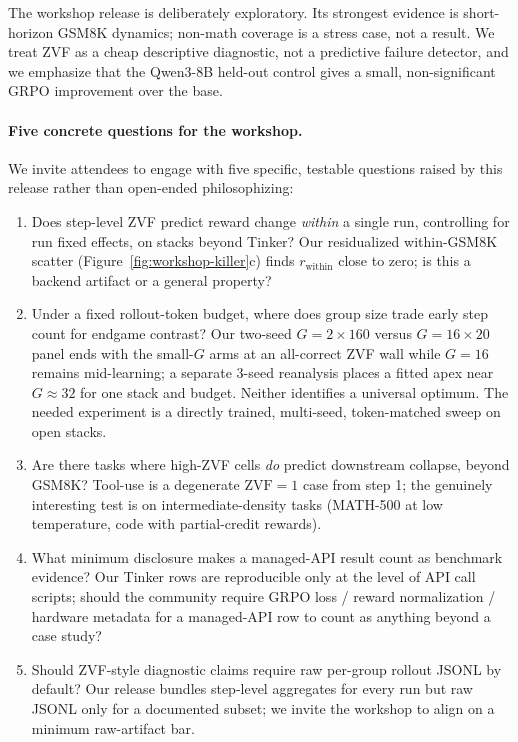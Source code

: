 \documentclass{article}
\begin{document}
The workshop release is deliberately exploratory. Its strongest evidence is
short-horizon GSM8K dynamics; non-math coverage is a stress case, not a
result. We treat ZVF as a cheap descriptive diagnostic, not a predictive
failure detector, and we emphasize that the Qwen3-8B held-out control gives
a small, non-significant GRPO improvement over the base.

\paragraph{Five concrete questions for the workshop.}
We invite attendees to engage with five specific, testable questions raised
by this release rather than open-ended philosophizing:
\begin{enumerate}[leftmargin=1.4em,topsep=2pt,itemsep=2pt]
  \item Does step-level ZVF predict reward change \emph{within} a single
        run, controlling for run fixed effects, on stacks beyond Tinker?
        Our residualized within-GSM8K scatter
        (Figure~\ref{fig:workshop-killer}c) finds $r_{\mathrm{within}}$
        close to zero; is this a backend artifact or a general property?
  \item Under a fixed rollout-token budget, where does group size trade early
        step count for endgame contrast? Our two-seed $G{=}2\times160$ versus
        $G{=}16\times20$ panel ends with the small-$G$ arms at an all-correct
        ZVF wall while $G{=}16$ remains mid-learning; a separate 3-seed
        reanalysis places a fitted apex near $G{\approx}32$ for one stack and
        budget. Neither identifies a universal optimum. The needed experiment
        is a directly trained, multi-seed, token-matched sweep on open stacks.
  \item Are there tasks where high-ZVF cells \emph{do} predict downstream
        collapse, beyond GSM8K? Tool-use is a degenerate $\mathrm{ZVF}{=}1$
        case from step 1; the genuinely interesting test is on
        intermediate-density tasks (MATH-500 at low temperature, code
        with partial-credit rewards).
  \item What minimum disclosure makes a managed-API result count as
        benchmark evidence? Our Tinker rows are reproducible only at the
        level of API call scripts; should the community require GRPO
        loss / reward normalization / hardware metadata for a managed-API
        row to count as anything beyond a case study?
  \item Should ZVF-style diagnostic claims require raw per-group rollout
        JSONL by default? Our release bundles step-level aggregates for
        every run but raw JSONL only for a documented subset; we invite
        the workshop to align on a minimum raw-artifact bar.
\end{enumerate}
 
\end{document}
